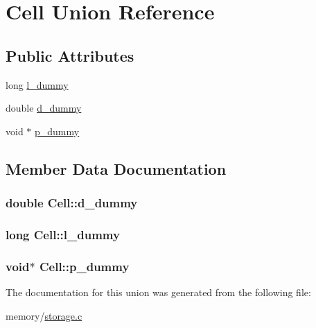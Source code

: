 \hypertarget{union_cell}{}\section{Cell Union Reference}
\label{union_cell}
\subsection*{Public Attributes}
\begin{DoxyCompactItemize}
\item 
long \hyperlink{union_cell_a1a43c4a13dabb18afb6cc6abab3c5dd3}{l\+\_\+dummy}
\item 
double \hyperlink{union_cell_a00a7dcdf70d80970444665f97eeddfbe}{d\+\_\+dummy}
\item 
void $\ast$ \hyperlink{union_cell_a690f8a25336f573548b07ae33d008fde}{p\+\_\+dummy}
\end{DoxyCompactItemize}


\subsection{Member Data Documentation}
\hypertarget{union_cell_a00a7dcdf70d80970444665f97eeddfbe}{}
\subsubsection[{d\+\_\+dummy}]{\setlength{\rightskip}{0pt plus 5cm}double Cell\+::d\+\_\+dummy}\label{union_cell_a00a7dcdf70d80970444665f97eeddfbe}
\hypertarget{union_cell_a1a43c4a13dabb18afb6cc6abab3c5dd3}{}
\subsubsection[{l\+\_\+dummy}]{\setlength{\rightskip}{0pt plus 5cm}long Cell\+::l\+\_\+dummy}\label{union_cell_a1a43c4a13dabb18afb6cc6abab3c5dd3}
\hypertarget{union_cell_a690f8a25336f573548b07ae33d008fde}{}
\subsubsection[{p\+\_\+dummy}]{\setlength{\rightskip}{0pt plus 5cm}void$\ast$ Cell\+::p\+\_\+dummy}\label{union_cell_a690f8a25336f573548b07ae33d008fde}


The documentation for this union was generated from the following file\+:\begin{DoxyCompactItemize}
\item 
memory/\hyperlink{storage_8c}{storage.\+c}\end{DoxyCompactItemize}

